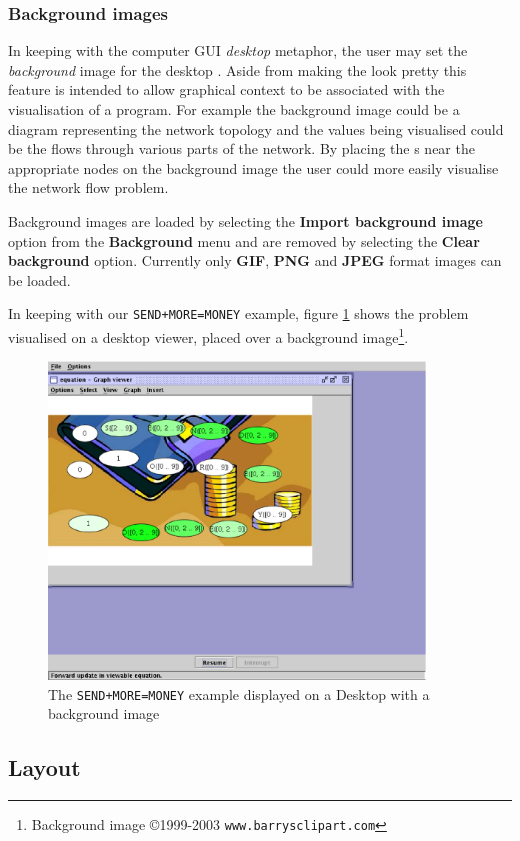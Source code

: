 \subsubsection{Background images}
In keeping with the computer GUI \emph{desktop} metaphor, the user may
set the \emph{background} image for the desktop \viewer{}.  Aside from
making the \viewer{} look pretty this feature is intended to allow
graphical context to be associated with the visualisation of a program.
For example the background image could be a diagram representing the
network topology and the values being visualised could be the flows
through various parts of the network.  By placing the \viewlet{}s near
the appropriate nodes on the background image the user could more
easily visualise the network flow problem.

Background images are loaded by selecting the \textbf{Import
background image} option from the \textbf{Background} menu and are
removed by selecting the \textbf{Clear background} option.  Currently
only \textbf{GIF}, \textbf{PNG} and \textbf{JPEG} format images can be
loaded.

In keeping with our \texttt{SEND+MORE=MONEY} example, figure
\ref{fig:sendmoremoney} shows the problem visualised on a desktop
viewer, placed over a background image\footnote{Background image
\copyright 1999-2003 \texttt{www.barrysclipart.com}}.


\begin{figure}[htsp]
\centering
\includegraphics[width=10cm]{vcsendmoremoney}
\caption{The \texttt{SEND+MORE=MONEY} example displayed on a Desktop
\viewer{} with a background image}
\label{fig:sendmoremoney}
\end{figure}

\subsection{Layout}

